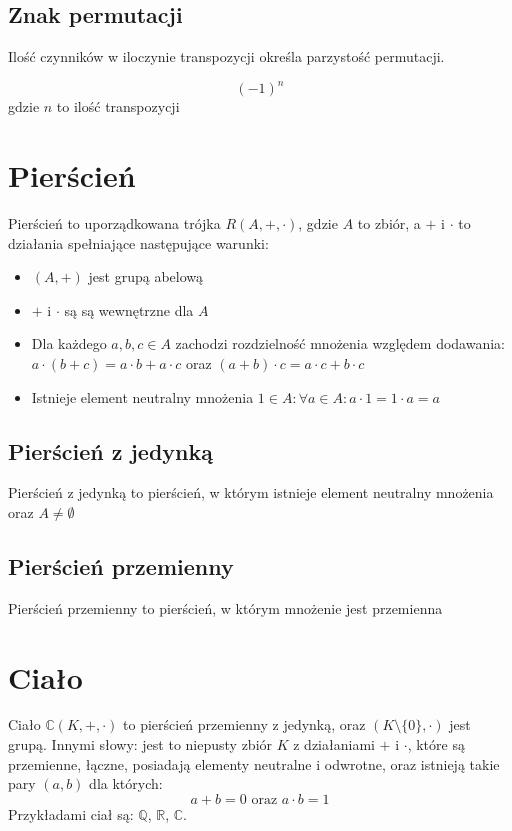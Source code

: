 \documentclass{../notatki}
\begin{document}
\subsection{Znak permutacji}

Ilość czynników w iloczynie transpozycji określa parzystość permutacji.

$$(-1)^n$$ gdzie $n$ to ilość transpozycji

\section{Pierścień}

Pierścień to uporządkowana trójka $R(A, +, \cdot)$, gdzie $A$ to
zbiór, a $+$ i $\cdot$ to działania spełniające następujące warunki:

\begin{itemize}
  \item $(A, +)$ jest grupą abelową
  \item $+$ i $\cdot$ są są wewnętrzne dla $A$
  \item Dla każdego $a, b, c \in A$ zachodzi rozdzielność mnożenia
    względem dodawania: $a \cdot (b + c) = a \cdot b + a \cdot c$
    oraz $(a + b) \cdot c = a \cdot c + b \cdot c$
  \item Istnieje element neutralny mnożenia $1 \in A: \forall a \in
    A: a \cdot 1 = 1 \cdot a = a$
\end{itemize}

\subsection{Pierścień z jedynką}

Pierścień z jedynką to pierścień, w którym istnieje element neutralny
mnożenia oraz $A \ne \emptyset$

\subsection{Pierścień przemienny}

Pierścień przemienny to pierścień, w którym mnożenie jest przemienna

\section{Ciało}

Ciało $\mathbb{C}(K, +, \cdot)$ to pierścień przemienny z jedynką, oraz $(K
\setminus \{0\}, \cdot)$ jest grupą.
Innymi słowy: jest to niepusty zbiór $K$ z działaniami $+$ i $\cdot$, które
są przemienne, łączne, posiadają elementy neutralne i odwrotne, oraz
istnieją takie pary $(a, b)$ dla których:
$$
a + b = 0 \text{ oraz } a \cdot b = 1
$$
Przykładami ciał są: $\mathbb{Q}$, $\mathbb{R}$, $\mathbb{C}$.
\end{document}
